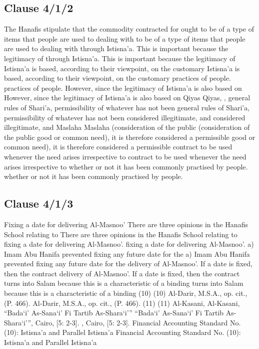 \documentclass{article}%
\begin{document}
\subsection{Clause 4/1/2}%
\label{subsec:Clause4/1/2}%
The Hanafis stipulate that the commodity contracted for ought  to be of a type of items that people are used to dealing with  to be of a type of items that people are used to dealing with  through Istisna’a. This is important because the legitimacy of  through Istisna’a. This is important because the legitimacy of  Istisna’a is based, according to their viewpoint, on the customary  Istisna’a is based, according to their viewpoint, on the customary  practices of people. practices of people.   However, since the legitimacy of Istisna’a is also based on    However, since the legitimacy of Istisna’a is also based on Qiyas Qiyas, ,  general rules of Shari’a, permissibility of whatever has not been  general rules of Shari’a, permissibility of whatever has not been  considered illegitimate, and  considered illegitimate, and Maslaha Maslaha (consideration of the public   (consideration of the public  good or common need), it is therefore considered a permissible  good or common need), it is therefore considered a permissible  contract to be used whenever the need arises irrespective to  contract to be used whenever the need arises irrespective to  whether or not it has been commonly practised by people. whether or not it has been commonly practised by people.

%
\subsection{Clause 4/1/3}%
\label{subsec:Clause4/1/3}%
Fixing a date for delivering Al-Masnoo’   There are three opinions in the Hanafis School relating to    There are three opinions in the Hanafis School relating to  fixing a date for delivering Al-Masnoo’. fixing a date for delivering Al-Masnoo’. a) Imam Abu Hanifa prevented fixing any future date for the  a) Imam Abu Hanifa prevented fixing any future date for the  delivery of Al-Masnoo’. If a date is fixed, then the contract  delivery of Al-Masnoo’. If a date is fixed, then the contract  turns into Salam because this is a characteristic of a binding  turns into Salam because this is a characteristic of a binding  (10) (10) Al-Darir, M.S.A., op. cit., (P. 466).  Al-Darir, M.S.A., op. cit., (P. 466). (11) (11) Al-Kasani,   Al-Kasani, “Bada`i’ As-Sana`i’ Fi Tartib As-Shara`i’” “Bada`i’ As-Sana`i’ Fi Tartib As-Shara`i’”, Cairo, [5: 2-3]. , Cairo, [5: 2-3]. Financial Accounting Standard No. (10): Istisna’a and Parallel Istisna’a Financial Accounting Standard No. (10): Istisna’a and Parallel Istisna’a
\end{document}
